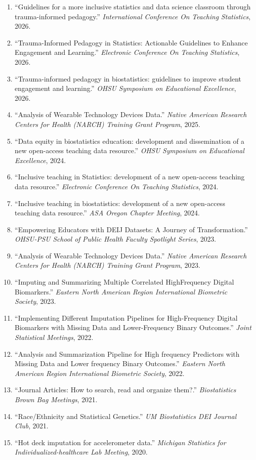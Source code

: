 

\begin{enumerate}
\item ``Guidelines for a more inclusive statistics and data science classroom through trauma-informed pedagogy.'' \textit{International Conference On Teaching Statistics}, 2026.
\item ``Trauma-Informed Pedagogy in Statistics: Actionable Guidelines to Enhance Engagement and Learning.'' \textit{Electronic Conference On Teaching Statistics}, 2026.
\item ``Trauma-informed pedagogy in biostatistics: guidelines to improve student engagement and learning.'' \textit{OHSU Symposium on Educational Excellence}, 2026.
\item ``Analysis of Wearable Technology Devices Data.'' \textit{Native American Research Centers for Health (NARCH) Training Grant Program}, 2025.
\item ``Data equity in biostatistics education: development and dissemination of a new open-access teaching data resource.'' \textit{OHSU Symposium on Educational Excellence}, 2024.
\item ``Inclusive teaching in Statistics: development of a new open-access teaching data resource.'' \textit{Electronic Conference On Teaching Statistics}, 2024.
\item ``Inclusive teaching in biostatistics: development of a new open-access teaching data resource.'' \textit{ASA Oregon Chapter Meeting}, 2024.
\item ``Empowering Educators with DEIJ Datasets: A Journey of Transformation.'' \textit{OHSU-PSU School of Public Health Faculty Spotlight Series}, 2023.
\item ``Analysis of Wearable Technology Devices Data.'' \textit{Native American Research Centers for Health (NARCH) Training Grant Program}, 2023.
\item ``Imputing and Summarizing Multiple Correlated HighFrequency Digital Biomarkers.'' \textit{Eastern North American Region International Biometric Society}, 2023.
\item ``Implementing Different Imputation Pipelines for High-Frequency Digital Biomarkers with Missing Data and Lower-Frequency Binary Outcomes.'' \textit{Joint Statistical Meetings}, 2022.
\item ``Analysis and Summarization Pipeline for High frequency Predictors with Missing Data and Lower frequency Binary Outcomes.'' \textit{Eastern North American Region International Biometric Society}, 2022.
\item ``Journal Articles: How to search, read and organize them?.'' \textit{Biostatistics Brown Bag Meetings}, 2021.
\item ``Race/Ethnicity and Statistical Genetics.'' \textit{UM Biostatistics DEI Journal Club}, 2021.
\item ``Hot deck imputation for accelerometer data.'' \textit{Michigan Statistics for Individualized-healthcare Lab Meeting}, 2020.
\end{enumerate}

